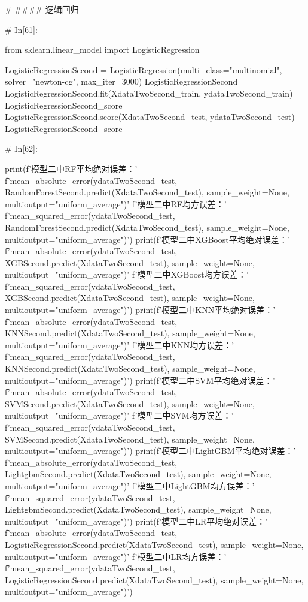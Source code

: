 \documentclass{MathorCupmodeling}
\begin{document}
\begin{python}
	# #### 逻辑回归
	
	# In[61]:
	
	
	from sklearn.linear_model import LogisticRegression
	
	LogisticRegressionSecond = LogisticRegression(multi_class="multinomial", solver="newton-cg", max_iter=3000)
	LogisticRegressionSecond = LogisticRegressionSecond.fit(XdataTwoSecond_train, ydataTwoSecond_train)
	LogisticRegressionSecond_score = LogisticRegressionSecond.score(XdataTwoSecond_test, ydataTwoSecond_test)
	LogisticRegressionSecond_score
	
	# In[62]:
	
	
	print(f'模型二中RF平均绝对误差：'
		  f'{mean_absolute_error(ydataTwoSecond_test, RandomForestSecond.predict(XdataTwoSecond_test), sample_weight=None, multioutput="uniform_average")}\n'
		  f'模型二中RF均方误差：'
		  f'{mean_squared_error(ydataTwoSecond_test, RandomForestSecond.predict(XdataTwoSecond_test), sample_weight=None, multioutput="uniform_average")}')
	print(f'模型二中XGBoost平均绝对误差：'
		  f'{mean_absolute_error(ydataTwoSecond_test, XGBSecond.predict(XdataTwoSecond_test), sample_weight=None, multioutput="uniform_average")}\n'
		  f'模型二中XGBoost均方误差：'
		  f'{mean_squared_error(ydataTwoSecond_test, XGBSecond.predict(XdataTwoSecond_test), sample_weight=None, multioutput="uniform_average")}')
	print(f'模型二中KNN平均绝对误差：'
		  f'{mean_absolute_error(ydataTwoSecond_test, KNNSecond.predict(XdataTwoSecond_test), sample_weight=None, multioutput="uniform_average")}\n'
		  f'模型二中KNN均方误差：'
		  f'{mean_squared_error(ydataTwoSecond_test, KNNSecond.predict(XdataTwoSecond_test), sample_weight=None, multioutput="uniform_average")}')
	print(f'模型二中SVM平均绝对误差：'
		  f'{mean_absolute_error(ydataTwoSecond_test, SVMSecond.predict(XdataTwoSecond_test), sample_weight=None, multioutput="uniform_average")}\n'
		  f'模型二中SVM均方误差：'
		  f'{mean_squared_error(ydataTwoSecond_test, SVMSecond.predict(XdataTwoSecond_test), sample_weight=None, multioutput="uniform_average")}')
	print(f'模型二中LightGBM平均绝对误差：'
		  f'{mean_absolute_error(ydataTwoSecond_test, LightgbmSecond.predict(XdataTwoSecond_test), sample_weight=None, multioutput="uniform_average")}\n'
		  f'模型二中LightGBM均方误差：'
		  f'{mean_squared_error(ydataTwoSecond_test, LightgbmSecond.predict(XdataTwoSecond_test), sample_weight=None, multioutput="uniform_average")}')
	print(f'模型二中LR平均绝对误差：'
		  f'{mean_absolute_error(ydataTwoSecond_test, LogisticRegressionSecond.predict(XdataTwoSecond_test), sample_weight=None, multioutput="uniform_average")}\n'
		  f'模型二中LR均方误差：'
		  f'{mean_squared_error(ydataTwoSecond_test, LogisticRegressionSecond.predict(XdataTwoSecond_test), sample_weight=None, multioutput="uniform_average")}')
	

\end{python}
\end{document}
